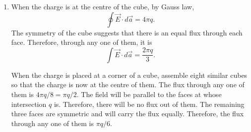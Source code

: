 \documentclass{article}
\begin{document}
\begin{enumerate}
\item When the charge is at the centre of the cube, by Gauss law,
\[
\oint\vec{E}\cdot d\vec{a} = 4\pi q.
\]
The symmetry of the cube suggests that there is an equal flux through each face.
Therefore, through any one of them, it is
\[
\int\vec{E}\cdot d\vec{a} = \frac{2\pi q}{3}.
\]

When the charge is placed at a corner of a cube, assemble eight similar cubes so
that the charge is now at the centre of them. The flux through any one of them is
$4\pi q/8 = \pi q/2$. The field will be parallel to the faces at whose intersection
$q$ is. Therefore, there will be no flux out of them. The remaining three faces
are symmetric and will carry the flux equally. Therefore, the flux through any
one of them is $\pi q/6$.
\end{enumerate}
\end{document}
